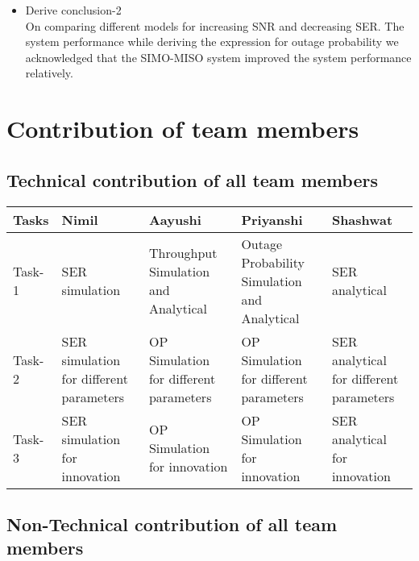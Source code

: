 \documentclass{article}
\begin{document}
\begin{itemize}	
\item Derive conclusion-2  
\\ On comparing different models for increasing SNR and decreasing SER. The system performance while deriving the expression for outage probability we acknowledged that the SIMO-MISO system improved the system performance relatively. 
\end{itemize}

\section{ Contribution of team members}	
\subsection{Technical contribution of all team members }

\begin{table}[h]
\centering
\begin{tabular}{|l|l|l|l|l|}
\hline
\textbf{Tasks} & \textbf{Nimil} & \textbf{Aayushi} & \textbf{Priyanshi}& \textbf{Shashwat}\\ \hline
Task-1        & SER simulation                        & Throughput Simulation and Analytical                       & Outage Probability Simulation and Analytical                   & SER analytical   \\ \hline

Task-2         &  SER simulation for different parameters                      & OP Simulation for different parameters                       & OP Simulation for different parameters                    & SER analytical for different parameters  \\ \hline

Task-3         &  SER simulation for innovation                      & OP Simulation for innovation                       & OP Simulation for innovation                    &SER analytical for innovation
\\ \hline
\end{tabular}
\end{table}

\subsection{Non-Technical contribution of all team members }
\end{document}
